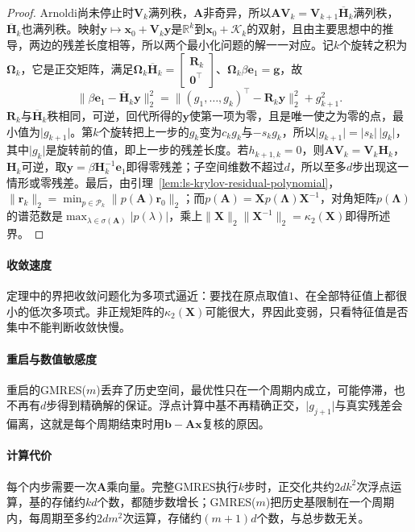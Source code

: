 \begin{proof}
Arnoldi尚未停止时$\bm V_k$满列秩，$\bm A$非奇异，所以$\bm A\bm V_k=\bm V_{k+1}\overline{\bm H}_k$满列秩，$\overline{\bm H}_k$也满列秩。映射$\bm y\mapsto\bm x_0+\bm V_k\bm y$是$\mathbb R^k$到$\bm x_0+\mathcal K_k$的双射，且由主要思想中的推导，两边的残差长度相等，所以两个最小化问题的解一一对应。记$k$个旋转之积为$\bm\Omega_k$，它是正交矩阵，满足$\bm\Omega_k\overline{\bm H}_k=\begin{bmatrix}\bm R_k\\\bm 0^\top\end{bmatrix}$、$\bm\Omega_k\beta\bm e_1=\bm g$，故
\[
 \lVert\beta\bm e_1-\overline{\bm H}_k\bm y\rVert_2^2
 =\lVert(g_1,\ldots,g_k)^\top-\bm R_k\bm y\rVert_2^2+g_{k+1}^2 .
\]
$\bm R_k$与$\overline{\bm H}_k$秩相同，可逆，回代所得的$\bm y$使第一项为零，且是唯一使之为零的点，最小值为$\lvert g_{k+1}\rvert$。第$k$个旋转把上一步的$g_k$变为$c_kg_k$与$-s_kg_k$，所以$\lvert g_{k+1}\rvert=\lvert s_k\rvert\,\lvert g_k\rvert$，其中$\lvert g_k\rvert$是旋转前的值，即上一步的残差长度。若$h_{k+1,k}=0$，则$\bm A\bm V_k=\bm V_k\bm H_k$，$\bm H_k$可逆，取$\bm y=\beta\bm H_k^{-1}\bm e_1$即得零残差；子空间维数不超过$d$，所以至多$d$步出现这一情形或零残差。最后，由引理~\ref{lem:ls-krylov-residual-polynomial}，$\lVert\bm r_k\rVert_2=\min_{p\in\mathcal P_k}\lVert p(\bm A)\bm r_0\rVert_2$；而$p(\bm A)=\bm Xp(\bm\Lambda)\bm X^{-1}$，对角矩阵$p(\bm\Lambda)$的谱范数是$\max_{\lambda\in\sigma(\bm A)}\lvert p(\lambda)\rvert$，乘上$\lVert\bm X\rVert_2\lVert\bm X^{-1}\rVert_2=\kappa_2(\bm X)$即得所述界。
\end{proof}

\paragraph{收敛速度}
定理中的界把收敛问题化为多项式逼近：要找在原点取值$1$、在全部特征值上都很小的低次多项式。非正规矩阵的$\kappa_2(\bm X)$可能很大，界因此变弱，只看特征值是否集中不能判断收敛快慢。

\paragraph{重启与数值敏感度}
重启的GMRES($m$)丢弃了历史空间，最优性只在一个周期内成立，可能停滞，也不再有$d$步得到精确解的保证。浮点计算中基不再精确正交，$\lvert g_{j+1}\rvert$与真实残差会偏离，这就是每个周期结束时用$\bm b-\bm A\bm x$复核的原因。

\paragraph{计算代价}
每个内步需要一次$\bm A$乘向量。完整GMRES执行$k$步时，正交化共约$2dk^2$次浮点运算，基的存储约$kd$个数，都随步数增长；GMRES($m$)把历史基限制在一个周期内，每周期至多约$2dm^2$次运算，存储约$(m+1)d$个数，与总步数无关。

